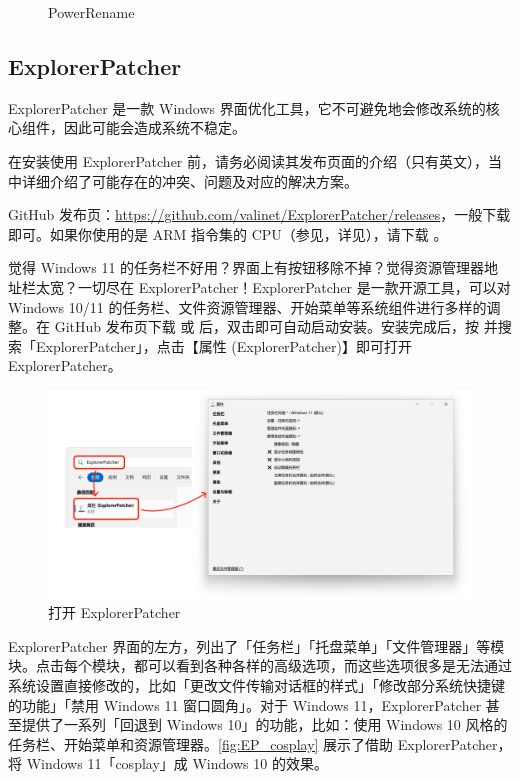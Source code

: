 \begin{itemize}
\begin{figure}[htb!]
      \caption{PowerRename}
      \label{fig:PowerRename}
    \end{figure}
\end{itemize}

\subsection{ExplorerPatcher}

\begin{dangerbox}
  ExplorerPatcher 是一款 Windows 界面优化工具，它不可避免地会修改系统的核心组件，因此可能会造成系统不稳定。

  在安装使用 ExplorerPatcher 前，请务必阅读其发布页面的介绍（只有英文），当中详细介绍了可能存在的冲突、问题及对应的解决方案。
\end{dangerbox}

GitHub 发布页：\url{https://github.com/valinet/ExplorerPatcher/releases}，一般下载  即可。如果你使用的是 ARM 指令集的 CPU（参见，详见），请下载 。

觉得 Windows 11 的任务栏不好用？界面上有按钮移除不掉？觉得资源管理器地址栏太宽？一切尽在 ExplorerPatcher！ExplorerPatcher 是一款开源工具，可以对 Windows 10/11 的任务栏、文件资源管理器、开始菜单等系统组件进行多样的调整。在 GitHub 发布页下载  或  后，双击即可自动启动安装。安装完成后，按  并搜索「ExplorerPatcher」，点击【属性 (ExplorerPatcher)】即可打开 ExplorerPatcher。

\begin{figure}[htb!]
  \centering
  \includegraphics[width=.75\textwidth]{assets/software/EP_open.png}
  \caption{打开 ExplorerPatcher}
  \label{fig:EP_open}
\end{figure}

ExplorerPatcher 界面的左方，列出了「任务栏」「托盘菜单」「文件管理器」等模块。点击每个模块，都可以看到各种各样的高级选项，而这些选项很多是无法通过系统设置直接修改的，比如「更改文件传输对话框的样式」「修改部分系统快捷键的功能」「禁用 Windows 11 窗口圆角」。对于 Windows 11，ExplorerPatcher 甚至提供了一系列「回退到 Windows 10」的功能，比如：使用 Windows 10 风格的任务栏、开始菜单和资源管理器。\autoref{fig:EP_cosplay} 展示了借助 ExplorerPatcher，将 Windows 11「cosplay」成 Windows 10 的效果。

